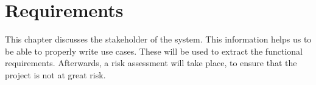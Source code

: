 \chapter{Requirements}
\label{ch:requirements}
This chapter discusses the stakeholder of the system. This information helps us to be able to properly write use cases. These will be used to extract the functional requirements. Afterwards, a risk assessment will take place, to ensure that the project is not at great risk.



%
















